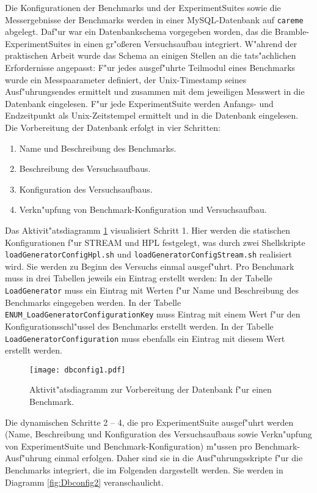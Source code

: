 Die Konfigurationen der Benchmarks und der ExperimentSuites sowie die Messergebnisse der Benchmarks werden in einer MySQL-Datenbank auf \texttt{careme} abgelegt. Daf"ur war ein Datenbankschema vorgegeben worden, das die Bramble-ExperimentSuites in einen gr"o\ss eren Versuchsaufbau integriert. W"ahrend der praktischen Arbeit wurde das Schema an einigen Stellen an die tats"achlichen Erfordernisse angepasst: F"ur jedes ausgef"uhrte Teilmodul eines Benchmarks wurde ein Messpaarameter definiert, der Unix-Timestamp seines Ausf"uhrungsendes ermittelt und zusammen mit dem jeweiligen Messwert in die Datenbank eingelesen. F"ur jede ExperimentSuite werden Anfangs- und Endzeitpunkt als Unix-Zeitstempel ermittelt und in die Datenbank eingelesen. Die Vorbereitung der Datenbank erfolgt in vier Schritten:  
\begin{enumerate}\bfseries
	\item Name und Beschreibung des Benchmarks. 
	\item Beschreibung des Versuchsaufbaus. 
	\item Konfiguration des Versuchsaufbaus. 
	\item Verkn"upfung von Benchmark-Konfiguration und Versuchsaufbau.
\end{enumerate} 
Das Aktivit"atsdiagramm \ref{fig:Dbconfig1} visualisiert Schritt 1. Hier werden die statischen Konfigurationen f"ur STREAM und HPL festgelegt, was durch zwei Shellskripte \texttt{loadGeneratorCon\-figHpl.sh} und \texttt{loadGenerator\-ConfigStream.sh} realisiert wird. Sie werden zu Beginn des Versuchs einmal ausgef"uhrt. Pro Benchmark muss in drei Tabellen jeweils ein Eintrag erstellt werden: In der Tabelle \texttt{LoadGenerator} muss ein Eintrag mit Werten f"ur Name und Beschreibung des Benchmarks eingegeben werden. In der Tabelle \texttt{ENUM\_LoadGeneratorConfigura\-tionKey} muss Eintrag mit einem Wert f"ur den Konfigurationsschl"ussel des Benchmarks erstellt werden. In der Tabelle \texttt{LoadGeneratorConfiguration} muss ebenfalls ein Eintrag mit diesem Wert erstellt werden.
\begin{figure}[htb]
\centering
\texttt{[image: dbconfig1.pdf]}
\caption{Aktivit"atsdiagramm zur Vorbereitung der Datenbank f"ur einen Benchmark.}
\label{fig:Dbconfig1}
\end{figure}
Die dynamischen Schritte 2 -- 4, die pro ExperimentSuite ausgef"uhrt werden (Name, Beschreibung und Konfiguration des Versuchsaufbaus sowie Verkn"upfung von ExperimentSuite und Benchmark-Konfiguration) m"ussen pro Benchmark-Ausf"uhrung einmal erfolgen. Daher sind sie in die Ausf"uhrungsskripte f"ur die Benchmarks integriert, die im Folgenden dargestellt werden. Sie werden in Diagramm \ref{fig:Dbconfig2} veranschaulicht. 

